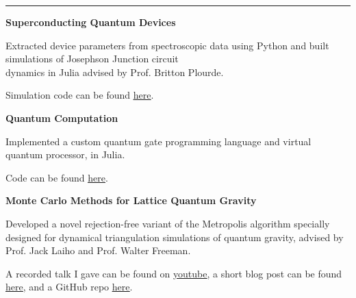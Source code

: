 \documentclass[9pt]{extarticle}
\newcommand{\myline}{\rule[\baselineskip]{\linewidth}{1pt}}
\begin{document}
\myline




\vspace{2.5pt}
\large\textbf{Superconducting Quantum Devices}
\normalsize
\begin{compactitem}

\item Extracted device parameters from spectroscopic data using Python and built simulations of Josephson Junction circuit \\ dynamics in Julia advised by Prof. Britton Plourde. 

\item Simulation code can be found \href{https://github.com/aarontrowbridge/cQED}{\underline{here}}.

\end{compactitem}

\vspace{2.5pt}
\large\textbf{Quantum Computation}
\normalsize

\begin{compactitem}
\item Implemented a custom quantum gate programming language and virtual quantum processor, in Julia. 

\item Code can be found \href{https://github.com/aarontrowbridge/QuIPS}{\underline{here}}.

\end{compactitem}

\vspace{2.5pt}
\large\textbf{Monte Carlo Methods for Lattice Quantum Gravity}
\normalsize

\begin{compactitem}
\item Developed a novel rejection-free variant of the Metropolis algorithm specially designed for dynamical triangulation simulations of quantum gravity, advised by Prof. Jack Laiho and Prof. Walter Freeman.
\item A recorded talk I gave can be found on \href{https://www.youtube.com/watch?v=_Ppx0e3aG-E&t=2s}{\underline{youtube}}, a short blog post can be found \href{https://aarontrowbridge.github.io/posts/the-freeman-method/}{\underline{here}}, and a GitHub repo \href{https://github.com/aarontrowbridge/Ising}{\underline{here}}.
\end{compactitem}
\end{document}
